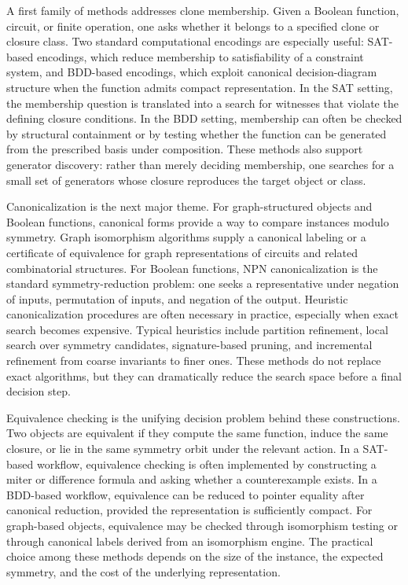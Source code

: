 \documentclass[11pt]{article}
\begin{document}
A first family of methods addresses clone membership. Given a Boolean function, circuit, or finite operation, one asks whether it belongs to a specified clone or closure class. Two standard computational encodings are especially useful: SAT-based encodings, which reduce membership to satisfiability of a constraint system, and BDD-based encodings, which exploit canonical decision-diagram structure when the function admits compact representation. In the SAT setting, the membership question is translated into a search for witnesses that violate the defining closure conditions. In the BDD setting, membership can often be checked by structural containment or by testing whether the function can be generated from the prescribed basis under composition. These methods also support generator discovery: rather than merely deciding membership, one searches for a small set of generators whose closure reproduces the target object or class.

Canonicalization is the next major theme. For graph-structured objects and Boolean functions, canonical forms provide a way to compare instances modulo symmetry. Graph isomorphism algorithms supply a canonical labeling or a certificate of equivalence for graph representations of circuits and related combinatorial structures. For Boolean functions, NPN canonicalization is the standard symmetry-reduction problem: one seeks a representative under negation of inputs, permutation of inputs, and negation of the output. Heuristic canonicalization procedures are often necessary in practice, especially when exact search becomes expensive. Typical heuristics include partition refinement, local search over symmetry candidates, signature-based pruning, and incremental refinement from coarse invariants to finer ones. These methods do not replace exact algorithms, but they can dramatically reduce the search space before a final decision step.

Equivalence checking is the unifying decision problem behind these constructions. Two objects are equivalent if they compute the same function, induce the same closure, or lie in the same symmetry orbit under the relevant action. In a SAT-based workflow, equivalence checking is often implemented by constructing a miter or difference formula and asking whether a counterexample exists. In a BDD-based workflow, equivalence can be reduced to pointer equality after canonical reduction, provided the representation is sufficiently compact. For graph-based objects, equivalence may be checked through isomorphism testing or through canonical labels derived from an isomorphism engine. The practical choice among these methods depends on the size of the instance, the expected symmetry, and the cost of the underlying representation.
\end{document}
